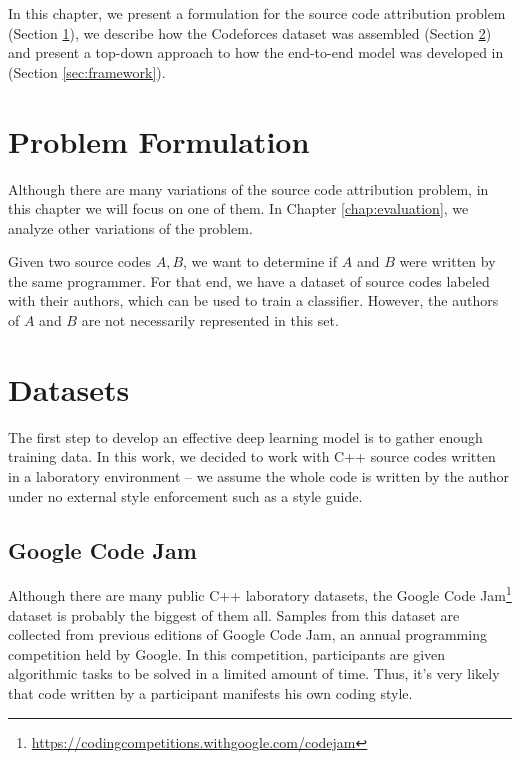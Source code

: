 
In this chapter, we present a formulation for the source code attribution problem (Section \ref{sec:formulation}), we describe how the Codeforces dataset was assembled (Section \ref{sec:dataset}) and present a top-down approach to how the end-to-end model was developed in (Section \ref{sec:framework}).

\section{Problem Formulation}\label{sec:formulation}

Although there are many variations of the source code attribution problem, in this chapter we will focus on one of them. In Chapter \ref{chap:evaluation}, we analyze other variations of the problem.

Given two source codes $A, B$, we want to determine if $A$ and $B$ were written by the same programmer. For that end, we have a dataset of source codes labeled with their authors, which can be used to train a classifier. However, the authors of $A$ and $B$ are not necessarily represented in this set.

\section{Datasets}\label{sec:dataset}

The first step to develop an effective deep learning model is to gather enough training data. In this work, we decided to work with C++ source codes written in a laboratory environment -- we assume the whole code is written by the author under no external style enforcement such as a style guide.

\subsection{Google Code Jam}

Although there are many public C++ laboratory datasets, the Google Code Jam\footnote{\url{https://codingcompetitions.withgoogle.com/codejam}} dataset \cite{caliskan_2015} is probably the biggest of them all. Samples from this dataset are collected from previous editions of Google Code Jam, an annual programming competition held by Google. In this competition, participants are given algorithmic tasks to be solved in a limited amount of time. Thus, it's very likely that code written by a participant manifests his own coding style.


